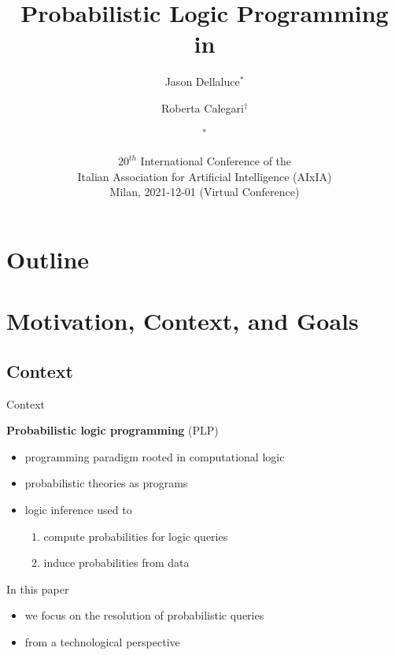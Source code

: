 \documentclass[presentation]{beamer}\mode<presentation>{\usetheme{AMSBolognaFC}}
\title[PLP in \twopkt{}]{Probabilistic Logic Programming in \twopkt{}}
\author[Dellaluce \and Calegari \and \sspeaker{Ciatto}]{
    Jason Dellaluce$^*$ \and Roberta Calegari$^\dagger$ \and \speaker{Giovanni Ciatto}$^*$
    \\\smallskip\small
    \email{jason.dellaluce@studio.unibo.it} \and \email{roberta.calegari@unibo.it} \and \speaker{\email{giovanni.ciatto@unibo.it}}
}
\institute[UniBO]{
    $^*$ \disi
    \\
    $^\dagger$ \almaai
    \\
    $^{*\dagger}$ \unibo
}
\date[AIxIA, Dec. 1, 2021]{
    $20^{th}$ International Conference of the
    \\
    Italian Association for Artificial Intelligence (AIxIA)
    \\\medskip
    Milan, 2021-12-01 (Virtual Conference)
}
\begin{document}

\frame{\titlepage}

\section*{Outline}

\frame[c]{\tableofcontents[hideallsubsections]}

\section{Motivation, Context, and Goals}

\subsection{Context}

\begin{frame}[c]{Context}
    \begin{block}{\textbf{Probabilistic logic programming} (PLP)}
        \begin{itemize}
            \item programming paradigm rooted in computational logic
            \item \alert{probabilistic} theories as programs
            \item logic \alert{inference} used to
            \begin{enumerate}
                \item compute \alert{probabilities} for logic queries
                \item induce probabilities from data
            \end{enumerate}
        \end{itemize}
    \end{block}
    \begin{block}{In this paper}
        \begin{itemize}
            \item we focus on the \alert{resolution} of probabilistic queries
            \item from a \alert{technological} perspective
        \end{itemize}
    \end{block}
\end{frame}
\end{document}
